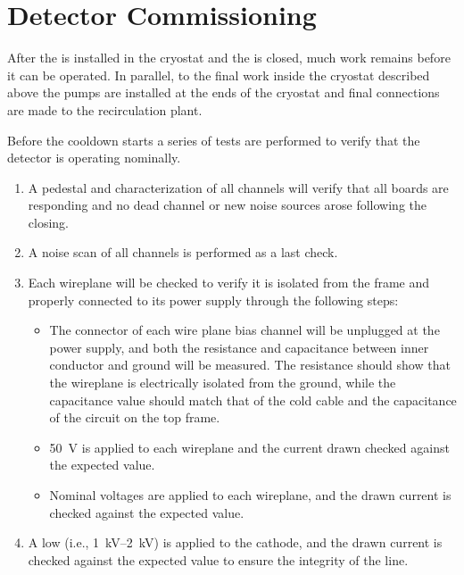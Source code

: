 \section{Detector Commissioning}
\label{sec:fdsp-tc-commiss}


After the  is installed in the cryostat and the  is closed, much work remains before it can be operated. In parallel, to the final work inside the cryostat described above the \lar pumps are installed at the ends of the cryostat and final connections are made to the recirculation plant. 

Before the cooldown starts a series of tests are performed to verify that the detector is operating nominally. 

\begin{enumerate}

    \item A pedestal and  characterization of all  channels will verify that all   boards are responding and no dead channel or new noise sources arose following the  closing.
    
    \item A noise scan of all  channels is performed as a last check. %

    \item Each  wireplane will be checked to verify it is isolated from the  frame and properly connected to its  power supply through the following steps:
    
\begin{itemize}

    \item The  connector of each wire plane bias channel will be unplugged at the power supply, and both the resistance and capacitance between inner conductor and ground will be measured. 
    The resistance should show that the wireplane is electrically isolated from the ground, while the capacitance value should match that of the cold  cable and the capacitance of the circuit on the  top frame.

    \item \SI{50}{V} is applied to each wireplane and the current drawn checked against the expected value.
    
    \item Nominal voltages are applied to each wireplane, and the  drawn current is checked against the expected value. 
    
\end{itemize}

    \item A low  (i.e., \SIrange{1}{2}{kV}) is applied to the cathode, and the drawn current is checked against the expected value to ensure the integrity of the  line.

\end{enumerate}

